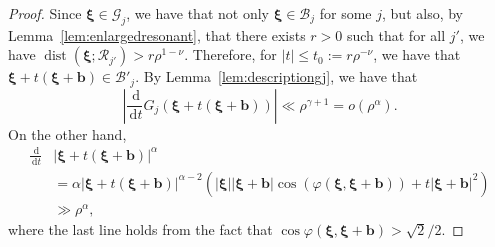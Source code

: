 \documentclass[AHL,Unicode,longabstracts,published]{cedram}
\DeclareMathOperator{\dist}{dist}
\newcommand{\de}{\, \mathrm{d}}
\newcommand{\CB}{\mathcal{B}}
\newcommand{\CG}{\mathcal{G}}
\newcommand{\CR}{\mathcal{R}}
\newcommand{\bxi}{\boldsymbol \xi}
\newcommand{\bbb}{\mathbf b}
\renewcommand{\phi}{\varphi}
\newcommand{\smallo}[1]{o\left(#1 \right)}
\newcommand{\abs}[1]{\left\lvert #1 \right\rvert}
\begin{document}
\begin{proof}
Since $\bxi \in \CG_j$, we have that not only $\bxi \in \CB_j$ for some $j$, but also, by Lemma~\ref{lem:enlargedresonant}, that there exists $r > 0$ such that for all $j'$, we have $\dist(\bxi;\CR_{j'}) > r \rho^{1-\nu}$. Therefore, for $\abs t \le t_0 := r \rho^{-\nu}$, we have that $\bxi + t(\bxi + \bbb) \in \CB'_j$. By Lemma~\ref{lem:descriptiongj}, we have that
\begin{equation}
\abs{\frac{\de}{\de t} G_j(\bxi + t(\bxi + \bbb))} \ll \rho^{\gamma+1} = \smallo{ \rho^\alpha}.
\end{equation}
On the other hand,
\begin{align}
\frac{\de}{\de t}& \abs{\bxi + t(\bxi + \bbb)}^\alpha\\ &= \alpha
\abs{\bxi + t (\bxi + \bbb)}^{\alpha - 2} \left(\abs \bxi \abs{\bxi +
\bbb}\cos\left(\phi(\bxi,\bxi+\bbb)\right) + t \abs{\bxi+\bbb}^2 \right)\nonumber\\
& \gg \rho^\alpha,
\end{align}
where the last line holds from the fact that $\cos \phi(\bxi,\bxi + \bbb) > \sqrt{2}/2$.
\end{proof}
\end{document}
